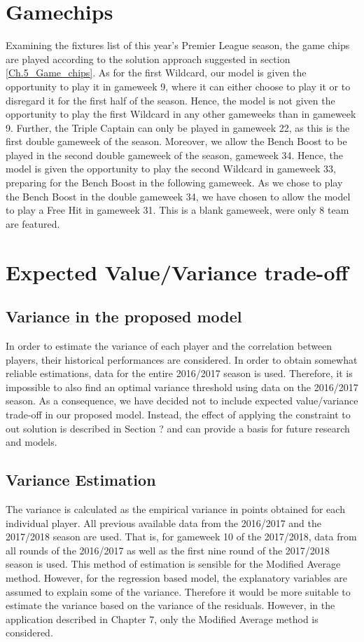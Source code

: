 \section{Gamechips} \label{exp_setup_gamechips}
Examining the fixtures list of this year's Premier League season, the game chips are played according to the solution approach suggested in section \ref{Ch.5_Game_chips}. As for the first Wildcard, our model is given the opportunity to play it in gameweek 9, where it can either choose to play it or to disregard it for the first half of the season. Hence, the model is not given the opportunity to play the first Wildcard in any other gameweeks than in gameweek 9. Further, the Triple Captain can only be played in gameweek 22, as this is the first double gameweek of the season. Moreover, we allow the Bench Boost to be played in the second double gameweek of the season, gameweek 34. Hence, the model is given the opportunity to play the second Wildcard in gameweek 33, preparing for the Bench Boost in the following gameweek. As we chose to play the Bench Boost in the double gameweek 34, we have chosen to allow the model to play a Free Hit in gameweek 31. This is a blank gameweek, were only 8 team are featured.


\section{Expected Value/Variance trade-off}
\label{exp_setup_Value_Variance}

\subsection{Variance in the proposed model}

In order to estimate the variance of each player and the correlation between players, their historical performances are considered. In order to obtain somewhat reliable estimations, data for the entire 2016/2017 season is used. Therefore, it is impossible to also find an optimal variance threshold using data on the 2016/2017 season. As a consequence, we have decided not to include expected value/variance trade-off in our proposed model. Instead, the effect of applying the constraint to out solution is described in Section ? and can provide a basis for future research and models.

\subsection{Variance Estimation}
The variance is calculated as the empirical variance in points obtained for each individual player. All previous available data from the 2016/2017 and the 2017/2018 season are used. That is, for gameweek 10 of the 2017/2018, data from all rounds of the 2016/2017 as well as the first nine round of the 2017/2018 season is used. This method of estimation is sensible for the Modified Average method. However, for the regression based model, the explanatory variables are assumed to explain some of the variance. Therefore it would be more suitable to estimate the variance based on the variance of the residuals. However, in the application described in Chapter 7, only the Modified Average method is considered. \newpar

